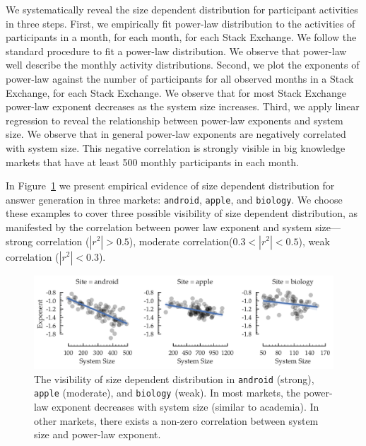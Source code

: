 We systematically reveal the size dependent distribution for participant activities in three steps. First, we empirically fit power-law distribution to the activities of participants in a month, for each month, for each Stack Exchange. We follow the standard procedure to fit a power-law distribution. We observe that power-law well describe the monthly activity distributions. Second, we plot the exponents of power-law against the number of participants for all observed months in a Stack Exchange, for each Stack Exchange. We observe that for most Stack Exchange power-law exponent decreases as the system size increases. Third, we apply linear regression to reveal the relationship between power-law exponents and system size. We observe that in general power-law exponents are negatively correlated with system size. This negative correlation is strongly visible in big knowledge markets that have at least 500 monthly participants in each month.

In Figure~\ref{fig:sdd} we present empirical evidence of size dependent distribution for answer generation in three markets: \texttt{android}, \texttt{apple}, and \texttt{biology}. We choose these examples to cover three possible visibility of size dependent distribution, as manifested by the correlation between 
power law exponent and system size---strong correlation ($|r^2|>0.5$), moderate correlation($0.3<|r^2|<0.5$), weak correlation ($|r^2|<0.3$).

\begin{figure}[hbt]
\vspace{-0.5\baselineskip}
\centering
\includegraphics[scale=0.38]{Figures/Size_Dependent_Distribution.pdf}
\vspace{-2\baselineskip}
\caption{The visibility of size dependent distribution in \texttt{android} (strong), \texttt{apple} (moderate), and \texttt{biology} (weak). In most markets, the power-law exponent decreases with system size (similar to academia). In other markets, there exists a non-zero correlation between system size and power-law exponent.}
\vspace{-\baselineskip}
\label{fig:sdd}
\end{figure}

